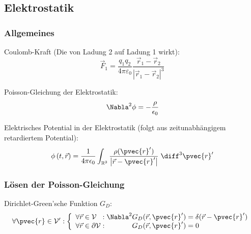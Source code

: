\documentclass[11pt]{article}
\numberwithin{equation}{section}
\begin{document}
    \subsection{Elektrostatik}
      \subsubsection{Allgemeines}

        Coulomb-Kraft (Die von Ladung 2 auf Ladung 1 wirkt):
        \begin{equation}
          \vec{F}_1 = \frac{q_1 q_2}{4\pi\varepsilon_0}\frac{\vec{r}_1-\vec{r}_2}{\left|\vec{r}_1-\vec{r}_2\right|^3}
        \end{equation}

        Poisson-Gleichung der Elektrostatik:
        \begin{equation}
          \Nabla^2\phi = -\frac{\rho}{\epsilon_0}
        \end{equation}

        Elektrisches Potential in der Elektrostatik (folgt aus zeitunabhängigem retardiertem Potential):
        \begin{equation}
          \phi\left(t,\vec{r}\right)
          = \frac{1}{4\pi\epsilon_0} \int_{\mathbb{R}^3} \frac{\rho(\pvec{r}')}{\left|\vec{r}-\pvec{r}'\right|}\;\diff^3 \pvec{r}'
        \end{equation}

      \subsubsection{Lösen der Poisson-Gleichung}
        Dirichlet-Green'sche Funktion $G_D$:
        \begin{equation}
          \forall\pvec{r}\in\mathcal{V}': \left\{\begin{array}{ll}
              \forall\vec{r}\in\mathcal{V}\phantom\partial:
              \Nabla^2 G_D(\vec{r},\pvec{r}') = \delta(\vec{r}-\pvec{r}') \\
              \forall\vec{r}\in\partial\mathcal{V}:
              \phantom{\Nabla^2}G_D(\vec{r},\pvec{r}') = 0
            \end{array}\right.
        \end{equation}
\end{document}
